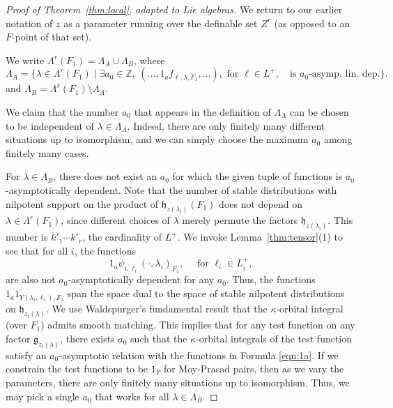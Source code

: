 \documentclass[12pt]{amsart}
\newcommand{\ring}[1]{{\mathbb #1}}
\def\Y{\Upsilon}
\newcommand{\fg}{\mathfrak{g}}
\newcommand{\fh}{\mathfrak{h}}
\theoremstyle{plain}
\theoremstyle{definition}
\begin{document}
\begin{proof}[Proof of Theorem~\ref{thm:local}, adapted to Lie algebras]
We return to our earlier notation of $z$ as a
parameter running over the definable set $Z^r$ (as opposed to an $F$-point
of that set).

We write $\Lambda^r(F_1) = \Lambda_A \cup\Lambda_B$, where
\[
\Lambda_A = \{\lambda\in\Lambda^r(F_1)\mid
\exists a_0\in\ring{Z},\ (\ldots,1_af_{\ell,\lambda,F_1},\ldots), \text{ for } \ell\in L^+,
\quad\text{is } a_0\text{-asymp. lin. dep.} \}.
\]
and $\Lambda_B = \Lambda^r(F_1)\setminus \Lambda_A$.  

We claim that the number $a_0$ that appears in the definition of $\Lambda_A$
can be chosen to be independent of $\lambda\in\Lambda_A$.  Indeed,
there are only finitely many different situations up to isomorphism,
and we can simply choose the maximum $a_0$ among finitely many cases.

For $\lambda\in \Lambda_B$, there does not exist an $a_0$ for which
the given tuple of functions is $a_0$-asymptotically dependent.  Note
that the number of stable distributions with nilpotent support on the
product of $\fh_{z(\lambda_i)}(F_1)$ does not depend on $\lambda\in
\Lambda^r(F_1)$, since different choices of $\lambda$ merely permute
the factors $\fh_{z(\lambda_i)}$.  This number is $k'_1\cdots k'_r$,
the cardinality of $L^+$.  We invoke Lemma~\ref{thm:tensor}(1) to see
that for all $i$, the functions
\begin{equation}\label{eqn:1a}
1_a\psi_{i,\ell_i}(\cdot,\lambda_i)_{F_1},\quad \text{ for }\ell_i\in L^+_i,
\end{equation}
are also not $a_0$-asymptotically dependent for any $a_0$.  Thus, the
functions $1_a 1_{Y(\lambda_i,\ell_i),F_1}$ span the space dual to the
space of stable nilpotent distributions on $\fh_{z_i(\lambda)}$.  We
use Waldspurger's fundamental result \cite{waldspurger1997lemme} that
the $\kappa$-orbital integral (over $F_1$) admits smooth
matching. This implies that for any test function on any factor
$\fg_{z_i(\lambda)}$, there exists $a_0$ such that the
$\kappa$-orbital integrals of the test function satisfy an
$a_0$-asymptotic relation with the functions in Formula \ref{eqn:1a}.
If we constrain the test functions to be $1_\Y$ for Moy-Prasad pairs,
then as we vary the parameters, there are only finitely many
situations up to isomorphism.  Thus, we may pick a single $a_0$ that
works for all $\lambda\in\Lambda_B$.


\end{proof}
\end{document}

